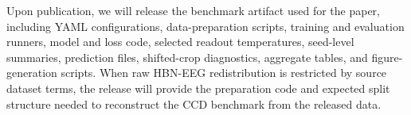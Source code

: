 \documentclass[12pt]{article}
\begin{document}
Upon publication, we will release the benchmark artifact used for the paper, including YAML configurations, data-preparation scripts, training and evaluation runners, model and loss code, selected readout temperatures, seed-level summaries, prediction files, shifted-crop diagnostics, aggregate tables, and figure-generation scripts. When raw HBN-EEG redistribution is restricted by source dataset terms, the release will provide the preparation code and expected split structure needed to reconstruct the CCD benchmark from the released data.


\FloatBarrier
\clearpage







% 




\end{document}

